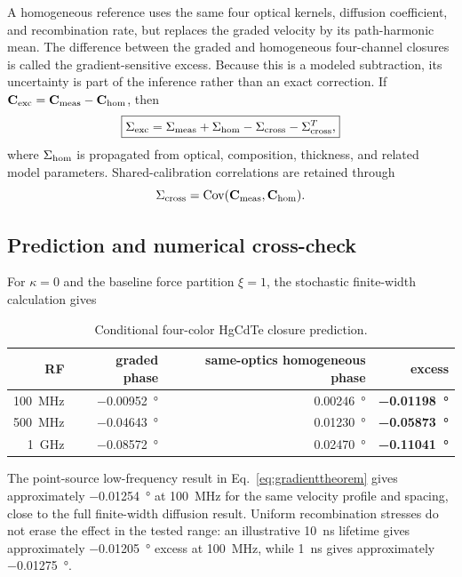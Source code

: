 \documentclass[11pt]{article}
\begin{document}
A homogeneous reference uses the same four optical kernels, diffusion coefficient, and recombination rate, but replaces the graded velocity by its path-harmonic mean. The difference between the graded and homogeneous four-channel closures is called the gradient-sensitive excess. Because this is a modeled subtraction, its uncertainty is part of the inference rather than an exact correction. If $\mathbf C_{\rm exc}=\mathbf C_{\rm meas}-\mathbf C_{\rm hom}$, then
\begin{equation}
\boxed{\Sigma_{\rm exc}=\Sigma_{\rm meas}+\Sigma_{\rm hom}-\Sigma_{\rm cross}-\Sigma_{\rm cross}^{T},}
\label{eq:baseline_covariance}
\end{equation}
where $\Sigma_{\rm hom}$ is propagated from optical, composition, thickness, and related model parameters. Shared-calibration correlations are retained through
\begin{equation}
\Sigma_{\rm cross}=\operatorname{Cov}(\mathbf C_{\rm meas},\mathbf C_{\rm hom}).
\end{equation}

\subsection{Prediction and numerical cross-check}

For $\kappa=0$ and the baseline force partition $\xi=1$, the stochastic finite-width calculation gives
\begin{table}[H]
\centering
\caption{Conditional four-color HgCdTe closure prediction.}
\begin{tabular}{rrrr}
\toprule
RF & graded phase & same-optics homogeneous phase & excess \\
\midrule
\SI{100}{MHz} & \SI{-0.00952}{\degree} & \SI{+0.00246}{\degree} & \textbf{\SI{-0.01198}{\degree}} \\
\SI{500}{MHz} & \SI{-0.04643}{\degree} & \SI{+0.01230}{\degree} & \textbf{\SI{-0.05873}{\degree}} \\
\SI{1}{GHz} & \SI{-0.08572}{\degree} & \SI{+0.02470}{\degree} & \textbf{\SI{-0.11041}{\degree}} \\
\bottomrule
\end{tabular}
\label{tab:hgclosure}
\end{table}

The point-source low-frequency result in Eq.~\eqref{eq:gradienttheorem} gives approximately \SI{-0.01254}{\degree} at \SI{100}{MHz} for the same velocity profile and spacing, close to the full finite-width diffusion result. Uniform recombination stresses do not erase the effect in the tested range: an illustrative \SI{10}{ns} lifetime gives approximately \SI{-0.01205}{\degree} excess at \SI{100}{MHz}, while \SI{1}{ns} gives approximately \SI{-0.01275}{\degree}.
\end{document}
